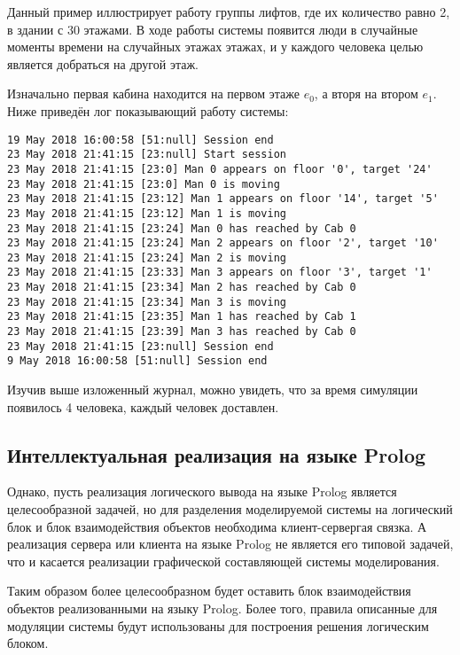 		Данный пример иллюстрирует работу группы лифтов, где их количество равно 2, в здании с 30 этажами.
			В ходе работы системы появится люди в случайные моменты времени на случайных этажах этажах,
			и у каждого человека целью является добраться на другой этаж.

		Изначально первая кабина находится на первом этаже $e_0$, а вторя на втором $e_1$.
			Ниже приведён лог показывающий работу системы:

\begin{lstlisting}
19 May 2018 16:00:58 [51:null] Session end
23 May 2018 21:41:15 [23:null] Start session
23 May 2018 21:41:15 [23:0] Man 0 appears on floor '0', target '24'
23 May 2018 21:41:15 [23:0] Man 0 is moving
23 May 2018 21:41:15 [23:12] Man 1 appears on floor '14', target '5'
23 May 2018 21:41:15 [23:12] Man 1 is moving
23 May 2018 21:41:15 [23:24] Man 0 has reached by Cab 0
23 May 2018 21:41:15 [23:24] Man 2 appears on floor '2', target '10'
23 May 2018 21:41:15 [23:24] Man 2 is moving
23 May 2018 21:41:15 [23:33] Man 3 appears on floor '3', target '1'
23 May 2018 21:41:15 [23:34] Man 2 has reached by Cab 0
23 May 2018 21:41:15 [23:34] Man 3 is moving
23 May 2018 21:41:15 [23:35] Man 1 has reached by Cab 1
23 May 2018 21:41:15 [23:39] Man 3 has reached by Cab 0
23 May 2018 21:41:15 [23:null] Session end
9 May 2018 16:00:58 [51:null] Session end
\end{lstlisting}

			Изучив выше изложенный журнал, можно увидеть, что за время симуляции появилось 4 человека,
				каждый человек доставлен.

		\subsection{Интеллектуальная реализация на языке Prolog}

		Однако, пусть реализация логического вывода на языке Prolog является целесообразной задачей, но для разделения моделируемой системы на логический блок и блок взаимодействия объектов необходима клиент-сервергая связка. А реализация сервера или клиента на языке Prolog не является его типовой задачей, что и касается реализации графической составляющей системы моделирования.

			Таким образом более целесообразном будет оставить блок взаимодействия объектов реализованными на языку Prolog.
				Более того, правила описанные для модуляции системы будут использованы
				для построения решения логическим блоком.

